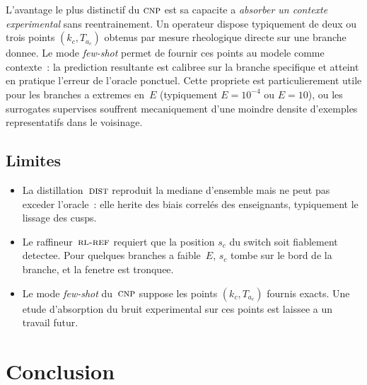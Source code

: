 \documentclass[11pt,a4paper]{article}
\newcommand{\Ta}{T_a}
\newcommand{\CNP}{\textsc{cnp}}              %
\newcommand{\DST}{\textsc{dist}}             %
\newcommand{\RLR}{\textsc{rl-ref}}           %
\begin{document}
L'avantage le plus distinctif du $\CNP$ est sa capacite a
\emph{absorber un contexte experimental} sans reentrainement. Un
operateur dispose typiquement de deux ou trois points
$(k_c,\Ta_c)$ obtenus par mesure rheologique directe sur une
branche donnee. Le mode \emph{few-shot} permet de fournir ces
points au modele comme contexte~: la prediction resultante est
calibree sur la branche specifique et atteint en pratique l'erreur
de l'oracle ponctuel. Cette propriete est particulierement utile
pour les branches a extremes en~$E$ (typiquement $E\!=\!10^{-4}$
ou $E\!=\!10$), ou les surrogates supervises souffrent
mecaniquement d'une moindre densite d'exemples
representatifs dans le voisinage.

\subsection{Limites}

\begin{itemize}[leftmargin=*,itemsep=2pt,topsep=4pt]
\item La distillation~$\DST$ reproduit la mediane d'ensemble mais
   ne peut pas exceder l'oracle~: elle herite des biais correlés
   des enseignants, typiquement le lissage des cusps.
\item Le raffineur~$\RLR$ requiert que la position $s_c$ du
   switch soit fiablement detectee. Pour quelques branches a
   faible~$E$, $s_c$ tombe sur le bord de la branche, et la
   fenetre est tronquee.
\item Le mode \emph{few-shot} du~$\CNP$ suppose les points
   $(k_c,\Ta_c)$ fournis exacts. Une etude d'absorption du bruit
   experimental sur ces points est laissee a un travail futur.
\end{itemize}


\section{Conclusion}
\label{sec:concl}
\end{document}
